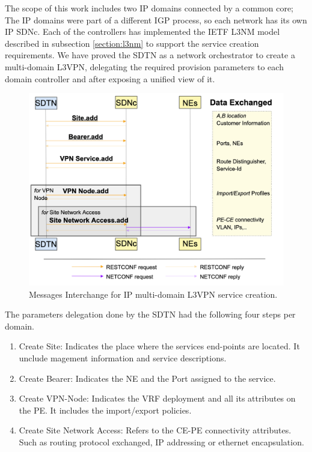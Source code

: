 \documentclass[10pt, conference]{IEEEtran}
\begin{document}
The scope of this work includes two IP domains connected by a common core; The IP domains were part of a different IGP process, so each network has its own IP SDNc. Each of the controllers has implemented the IETF L3NM model described in subsection \ref{section:l3nm} to support the service creation requirements. We have proved the SDTN  as a network orchestrator to create a multi-domain L3VPN, delegating the required provision parameters to each domain controller and after exposing a unified view of it.

\begin{figure}
	\centering
		\includegraphics[width=\linewidth]{figs/diagram-9.png}
	\caption{Messages Interchange for IP multi-domain L3VPN service creation.}
	\label{FIG:l3vpn_workflow}
\end{figure}

The parameters delegation done by the SDTN  had the following four steps per domain.
\begin{enumerate}
    \item Create Site: Indicates the place where the services end-points are located. It unclude magement information and service descriptions. 
    \item Create Bearer: Indicates the NE and the Port assigned to the service.
    \item Create VPN-Node: Indicates the VRF deployment and all its attributes on the PE. It includes the import/export policies.
    \item Create Site Network Access: Refers to the CE-PE connectivity attributes. Such as routing protocol exchanged, IP addressing or ethernet encapsulation. 
\end{enumerate}
\end{document}
